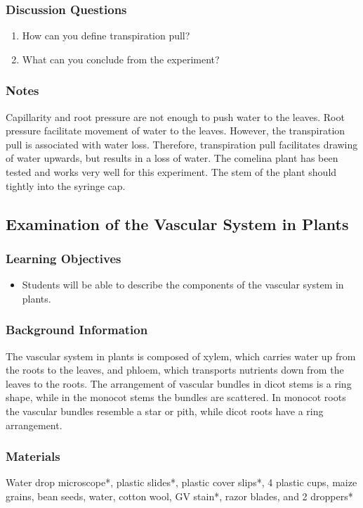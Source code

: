 \subsubsection*{Discussion Questions}
\begin{enumerate}
\item{How can you define transpiration pull?}
\item{What can you conclude from the experiment?}
\end{enumerate}

\subsubsection*{Notes}
Capillarity and root pressure are not enough to push water to the leaves. Root pressure facilitate movement of water to the leaves. However, the transpiration pull is associated with water loss. Therefore, transpiration pull facilitates drawing of water upwards, but results in a loss of water. The comelina plant has been tested and works very well for this experiment. The stem of the plant should tightly into the syringe cap.


\subsection{Examination of the Vascular System in Plants}

\subsubsection*{Learning Objectives}
\begin{itemize}
\item{Students will be able to describe the components of the vascular system in plants.}
\end{itemize}

\subsubsection*{Background Information}
The vascular system in plants is composed of xylem, which carries water up from the roots to the leaves, and phloem, which transports nutrients down from the leaves to the roots. The arrangement of vascular bundles in dicot stems is a ring shape, while in the monocot stems the bundles are scattered. In monocot roots the vascular bundles resemble a star or pith, while dicot roots have a ring arrangement.

\subsubsection*{Materials}
Water drop microscope*, plastic slides*, plastic cover slips*, 4 plastic cups, maize grains, bean seeds, water, cotton wool, GV stain*, razor blades, and 2 droppers*

